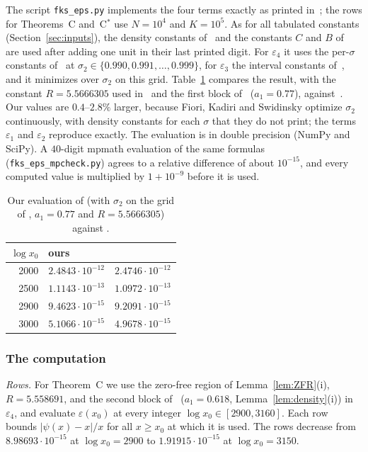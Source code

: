 \documentclass{amsart}
\theoremstyle{definition}
\theoremstyle{remark}
\theoremstyle{plain}
\numberwithin{equation}{section}
\newcommand{\eps}{\varepsilon}
\newcommand{\Cstar}{C$^*$}
\begin{document}
The script \texttt{fks\_eps.py} implements the four terms exactly as printed in~\cite{FKS23}; the rows for Theorems~C and~\Cstar{} use $N=10^4$ and $K=10^5$. As for all tabulated constants (Section~\ref{sec:inputs}), the density constants of~\cite[Tables~7 and~8]{FKS23} and the constants $C$ and $B$ of~\cite[Table~2]{Bel24} are used after adding one unit in their last printed digit. For $\eps_4$ it uses the per-$\sigma$ constants of~\cite[Table~7]{FKS23} at $\sigma_2\in\{0.990,0.991,\dots,0.999\}$, for $\eps_3$ the interval constants of~\cite[Table~8]{FKS23}, and it minimizes over $\sigma_2$ on this grid. Table~\ref{tab:fksval} compares the result, with the constant $R=5.5666305$ used in~\cite{FKS23} and the first block of~\cite[Table~7]{FKS23} ($a_1=0.77$), against~\cite[Table~5]{FKS23}. Our values are $0.4$--$2.8\%$ larger, because Fiori, Kadiri and Swidinsky optimize $\sigma_2$ continuously, with density constants for each $\sigma$ that they do not print; the terms $\eps_1$ and $\eps_2$ reproduce exactly. The evaluation is in double precision (NumPy and SciPy). A $40$-digit mpmath evaluation of the same formulas (\texttt{fks\_eps\_mpcheck.py}) agrees to a relative difference of about $10^{-15}$, and every computed value is multiplied by $1+10^{-9}$ before it is used.

\begin{table}[ht]
\caption{Our evaluation of \cite[Thm.~1.1]{FKS23} (with $\sigma_2$ on the grid of \cite[Table~7]{FKS23}, $a_1=0.77$ and $R=5.5666305$) against \cite[Table~5]{FKS23}.}\label{tab:fksval}
\small
\begin{tabular}{rll}
\toprule
$\log x_0$ & ours & \cite[Table~5]{FKS23}\\
\midrule
2000 & $2.4843\cdot10^{-12}$ & $2.4746\cdot10^{-12}$\\
2500 & $1.1143\cdot10^{-13}$ & $1.0972\cdot10^{-13}$\\
2900 & $9.4623\cdot10^{-15}$ & $9.2091\cdot10^{-15}$\\
3000 & $5.1066\cdot10^{-15}$ & $4.9678\cdot10^{-15}$\\
\bottomrule
\end{tabular}
\end{table}

\subsubsection{The computation}
\emph{Rows.} For Theorem~C we use the zero-free region of Lemma~\ref{lem:ZFR}(i), $R=5.558691$, and the second block of~\cite[Table~7]{FKS23} ($a_1=0.618$, Lemma~\ref{lem:density}(i)) in $\eps_4$, and evaluate $\eps(x_0)$ at every integer $\log x_0\in[2900,3160]$. Each row bounds $|\psi(x)-x|/x$ for all $x\ge x_0$ at which it is used. The rows decrease from $8.98693\cdot10^{-15}$ at $\log x_0=2900$ to $1.91915\cdot10^{-15}$ at $\log x_0=3150$.
\end{document}
